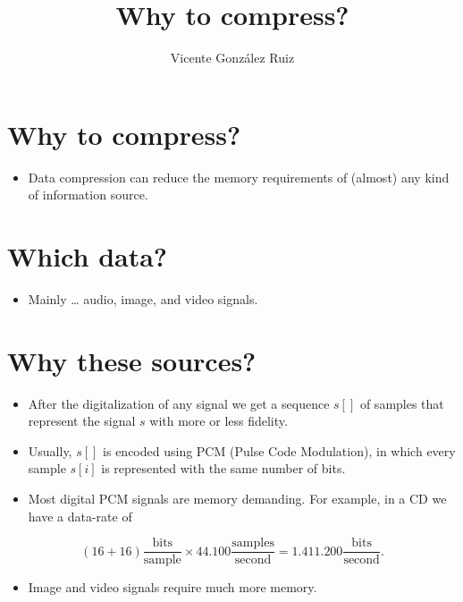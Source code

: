 
\title{Why to compress?}
\author{Vicente González Ruiz}

\maketitle
\tableofcontents

\section{Why to compress?}
\begin{itemize}
\item Data compression can reduce the memory requirements of (almost) any kind of information source.
\end{itemize}

\section{Which data?}\label{which-data}
\begin{itemize}
\item Mainly \ldots{} audio, image, and video signals.
\end{itemize}

\section{Why these sources?}

\begin{itemize}
\item After the digitalization of any signal we get a sequence \(s[]\) of samples that represent the signal \(s\) with more or less fidelity.
\item Usually, \(s[]\) is encoded using PCM (Pulse Code Modulation), in which every sample \(s[i]\) is represented with the same number of bits.
\item Most digital PCM signals are memory demanding. For example, in a CD we have a data-rate of
\end{itemize}

\begin{equation}
  (16+16)\frac{\text{bits}}{\text{sample}}\times
  44{.}100\frac{\text{samples}}{\text{second}}=
  1{.}411{.}200\frac{\text{bits}}{\text{second}}.
\end{equation}

\begin{itemize}
\item Image and video signals require much more memory.
\end{itemize}

